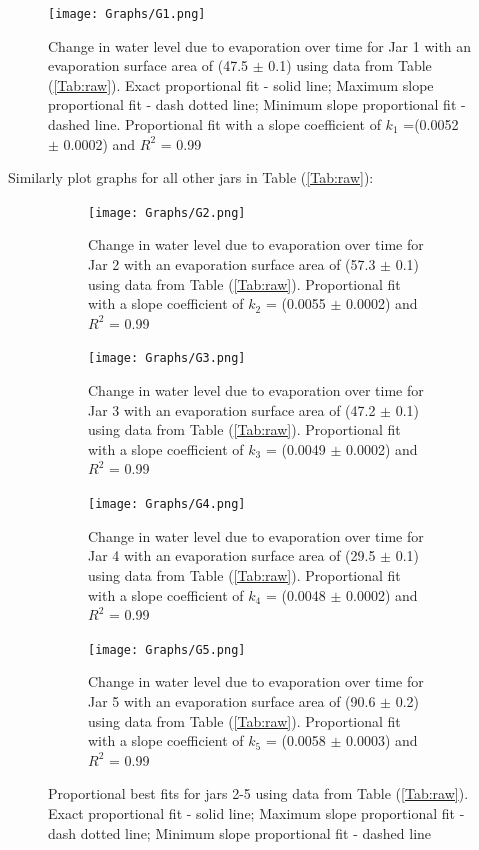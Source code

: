\documentclass[12pt,letterpaper,final]{report}
\begin{document}
\begin{figure}[h!]
\begin{center}
\texttt{[image: Graphs/G1.png]}
\caption{Change in water level due to evaporation over time for Jar 1 with an evaporation surface area of (47.5 $\pm$ 0.1)  using data from Table (\ref{Tab:raw}).  Exact proportional fit - solid line; Maximum slope proportional fit - dash dotted line; Minimum slope proportional fit - dashed line. Proportional fit with a slope coefficient of $k_{1}$ =(0.0052 $\pm$ 0.0002)  and $R^{2}$ = 0.99} \label{fig:gr1}
\end{center}
\end{figure} \FloatBarrier
\medskip \noindent Similarly plot graphs for all other jars in Table (\ref{Tab:raw}):\FloatBarrier
\begin{figure}[h!]
\begin{center}
\begin{subfigure}[b]{0.48 \textwidth}
\texttt{[image: Graphs/G2.png]}
\caption{Change in water level due to evaporation over time for Jar 2 with an evaporation surface area of (57.3 $\pm$ 0.1)   using data from Table (\ref{Tab:raw}). Proportional fit with a slope coefficient of $k_{2}$ = (0.0055 $\pm$ 0.0002)  and $R^{2}$ = 0.99}
\end{subfigure}%
\hfill
\begin{subfigure}[b]{0.48 \textwidth}
\texttt{[image: Graphs/G3.png]}
\caption{Change in water level due to evaporation over time for Jar 3 with an evaporation surface area of (47.2 $\pm$ 0.1)   using data from Table (\ref{Tab:raw}). Proportional fit with a slope coefficient of $k_{3}$ = (0.0049 $\pm$ 0.0002)   and $R^{2}$ = 0.99}
\end{subfigure}%
 \hfill
\begin{subfigure}[b]{0.48 \textwidth}
\texttt{[image: Graphs/G4.png]}
\caption{Change in water level due to evaporation over time for Jar 4 with an evaporation surface area of (29.5 $\pm$ 0.1)   using data from Table (\ref{Tab:raw}). Proportional fit with a slope coefficient of $k_{4}$ = (0.0048 $\pm$ 0.0002)   and $R^{2}$ = 0.99}
\end{subfigure}%
\hfill
\begin{subfigure}[b]{0.48 \textwidth}
\texttt{[image: Graphs/G5.png]}
\caption{Change in water level due to evaporation over time for Jar 5 with an evaporation surface area of (90.6 $\pm$ 0.2)   using data from Table (\ref{Tab:raw}). Proportional fit with a slope coefficient of $k_{5}$ = (0.0058 $\pm$ 0.0003)   and $R^{2}$ = 0.99}
\end{subfigure}%
\caption{Proportional best fits for jars 2-5 using data from Table (\ref{Tab:raw}). Exact proportional fit - solid line; Maximum slope proportional fit - dash dotted line; Minimum slope proportional fit - dashed line } \label{fig:graphr}
\end{center}
\end{figure}\FloatBarrier
\end{document}
